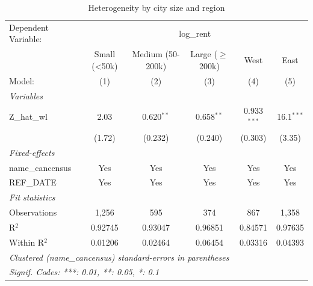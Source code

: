 
\begin{table}[htbp]
   \caption{\label{tab:heterogeneity_size_region} Heterogeneity by city size and region}
   \centering
   \begin{tabular}{lccccc}
      \tabularnewline \midrule \midrule
      Dependent Variable: & \multicolumn{5}{c}{log\_rent}\\
                       & Small (<50k) & Medium (50-200k) & Large ($\geq$200k)  & West          & East \\   
      Model:           & (1)          & (2)              & (3)                 & (4)           & (5)\\  
      \midrule
      \emph{Variables}\\
      Z\_hat\_wl       & 2.03         & 0.620$^{**}$     & 0.658$^{**}$        & 0.933$^{***}$ & 16.1$^{***}$\\   
                       & (1.72)       & (0.232)          & (0.240)             & (0.303)       & (3.35)\\   
      \midrule
      \emph{Fixed-effects}\\
      name\_cancensus  & Yes          & Yes              & Yes                 & Yes           & Yes\\  
      REF\_DATE        & Yes          & Yes              & Yes                 & Yes           & Yes\\  
      \midrule
      \emph{Fit statistics}\\
      Observations     & 1,256        & 595              & 374                 & 867           & 1,358\\  
      R$^2$            & 0.92745      & 0.93047          & 0.96851             & 0.84571       & 0.97635\\  
      Within R$^2$     & 0.01206      & 0.02464          & 0.06454             & 0.03316       & 0.04393\\  
      \midrule \midrule
      \multicolumn{6}{l}{\emph{Clustered (name\_cancensus) standard-errors in parentheses}}\\
      \multicolumn{6}{l}{\emph{Signif. Codes: ***: 0.01, **: 0.05, *: 0.1}}\\
   \end{tabular}
\end{table}


